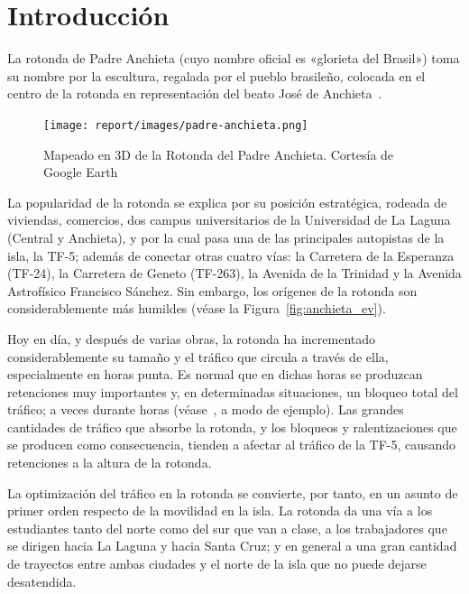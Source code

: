 \chapter{Introducción}
\label{cap:intro}

La rotonda de Padre Anchieta (cuyo nombre oficial es «glorieta del Brasil») toma su nombre por la escultura, regalada por el pueblo brasileño, colocada en el centro de la rotonda en representación del beato José de Anchieta~\cite{gallo_glorieta_2013}.

\begin{figure}[H]
    \centering
    \texttt{[image: report/images/padre-anchieta.png]}
    \caption[Mapeado en 3D de la Rotonda del Padre Anchieta.]{Mapeado en 3D de la Rotonda del Padre Anchieta. Cortesía de Google Earth\protect\footnotemark}
    \label{fig:padre_anchieta_3d}
\end{figure}


La popularidad de la rotonda se explica por su posición estratégica, rodeada de viviendas, comercios, dos campus universitarios de la Universidad de La Laguna (Central y Anchieta), y por la cual pasa una de las principales autopistas de la isla, la TF-5; además de conectar otras cuatro vías: la Carretera de la Esperanza (TF-24), la Carretera de Geneto (TF-263), la Avenida de la Trinidad y la Avenida Astrofísico Francisco Sánchez. Sin embargo, los orígenes de la rotonda son considerablemente más humildes (véase la Figura~\ref{fig:anchieta_ev}).

Hoy en día, y después de varias obras, la rotonda ha incrementado considerablemente su tamaño y el tráfico que circula a través de ella, especialmente en horas punta. Es normal que en dichas horas se produzcan retenciones muy importantes y, en determinadas situaciones, un bloqueo total del tráfico; a veces durante horas (véase~\cite{gulesserian_vuelven_2018}, a modo de ejemplo). Las grandes cantidades de tráfico que absorbe la rotonda, y los bloqueos y ralentizaciones que se producen como consecuencia, tienden a afectar al tráfico de la TF-5, causando retenciones a la altura de la rotonda.

La optimización del tráfico en la rotonda se convierte, por tanto, en un asunto de primer orden respecto de la movilidad en la isla. La rotonda da una vía a los estudiantes tanto del norte como del sur que van a clase, a los trabajadores que se dirigen hacia La Laguna y hacia Santa Cruz; y en general a una gran cantidad de trayectos entre ambas ciudades y el norte de la isla que no puede dejarse desatendida.


